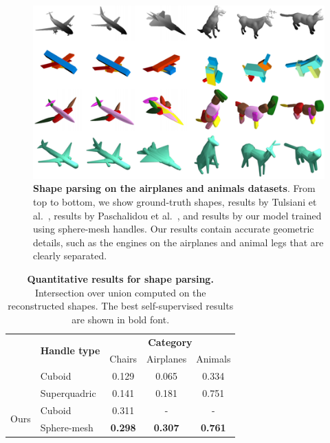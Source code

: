 \begin{figure}
\centering
\includegraphics[width=1.0\linewidth]{handles/imgs/qualiall.png}
\vspace{-20pt}
\caption{\label{fig:all} \small
\textbf{Shape parsing on the airplanes and animals datasets}. From top to bottom, we show ground-truth shapes,
results by Tulsiani et al.~\cite{Tulsiani2017},
results by Paschalidou et al.~\cite{Paschalidou2019}, and results by our model trained using sphere-mesh handles.
Our results contain accurate geometric details, such as
the engines on the airplanes and animal legs that are clearly separated.
}
\end{figure}

\begin{table}[t]
\centering
\small
\begin{tabular}{l|l|ccc}
                   & \multirow{2}{*}{\textbf{Handle type}}  & \multicolumn{3}{c}{\textbf{Category}}        \\
                   &              & Chairs   & Airplanes & Animals \\
                   \hline
\cite{Tulsiani2017}    & Cuboid       & 0.129   & 0.065    & 0.334  \\
\cite{Paschalidou2019} & Superquadric & 0.141   & 0.181    & 0.751  \\
\hline
\multirow{ 2}{*}{Ours}               & Cuboid       & 0.311    & -         & -       \\
               & Sphere-mesh  & \textbf{0.298}    & \textbf{0.307}     & \textbf{0.761}      \\
\hline
\end{tabular}
\caption{
\label{tab:parse}
\textbf{Quantitative results for shape parsing.} Intersection over union computed
on the reconstructed shapes. The best self-supervised results are shown in bold font.
}
\end{table}

